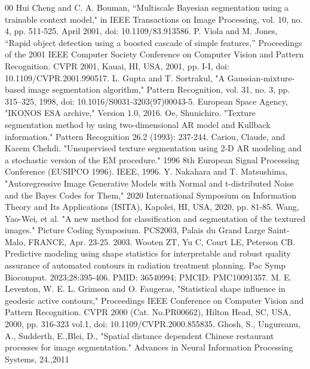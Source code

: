 \documentclass{jsarticle}
\theoremstyle{definition}
\begin{document}
\begin{thebibliography}{00}
   Hui Cheng and C. A. Bouman, ``Multiscale Bayesian segmentation using a trainable context model," in IEEE Transactions on Image Processing, vol. 10, no. 4, pp. 511-525, April 2001, doi: 10.1109/83.913586.
   P. Viola and M. Jones, ``Rapid object detection using a boosted cascade of simple features,” Proceedings of the 2001 IEEE Computer Society Conference on Computer Vision and Pattern Recognition. CVPR 2001, Kauai, HI, USA, 2001, pp. I-I, doi: 10.1109/CVPR.2001.990517.
   L. Gupta and T. Sortrakul, "A Gaussian-mixture-based image segmentation algorithm," Pattern Recognition, vol. 31, no. 3, pp. 315–325, 1998, doi: 10.1016/S0031-3203(97)00043-5.
   European Space Agency, "IKONOS ESA archive," Version 1.0, 2016.
   Oe, Shunichiro. "Texture segmentation method by using two-dimensional AR model and Kullback information." Pattern Recognition 26.2 (1993): 237-244.
   Cariou, Claude, and Kacem Chehdi. "Unsupervised texture segmentation using 2-D AR modeling and a stochastic version of the EM procedure." 1996 8th European Signal Processing Conference (EUSIPCO 1996). IEEE, 1996.
   Y. Nakahara and T. Matsushima, "Autoregressive Image Generative Models with Normal and t-distributed Noise and the Bayes Codes for Them," 2020 International Symposium on Information Theory and Its Applications (ISITA), Kapolei, HI, USA, 2020, pp. 81-85.
   Wang, Yao-Wei, et al. "A new method for classification and segmentation of the textured images." Picture Coding Symposium. PCS2003, Palais du Grand Large Saint-Malo, FRANCE, Apr. 23-25. 2003.
   Wooten ZT, Yu C, Court LE, Peterson CB. Predictive modeling using shape statistics for interpretable and robust quality assurance of automated contours in radiation treatment planning. Pac Symp Biocomput. 2023;28:395-406. PMID: 36540994; PMCID: PMC10091357.
   M. E. Leventon, W. E. L. Grimson and O. Faugeras, "Statistical shape influence in geodesic active contours," Proceedings IEEE Conference on Computer Vision and Pattern Recognition. CVPR 2000 (Cat. No.PR00662), Hilton Head, SC, USA, 2000, pp. 316-323 vol.1, doi: 10.1109/CVPR.2000.855835.
   Ghosh, S., Ungureanu, A., Sudderth, E.,Blei, D., "Spatial distance dependent Chinese restaurant processes for image segmentation." Advances in Neural Information Processing Systems, 24.,2011
  \end{thebibliography}
\end{document}
